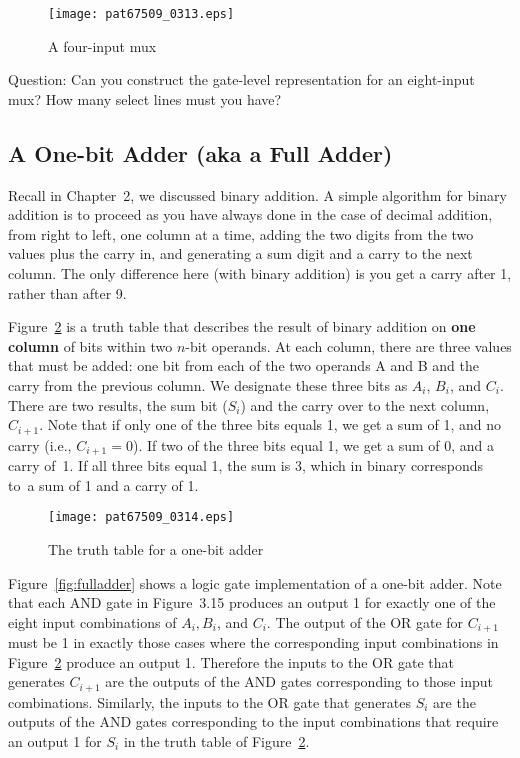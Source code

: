 \documentclass{patt}
\begin{document}
\begin{figure}
\centerline{\texttt{[image: pat67509\_0313.eps]}}
\caption{A four-input mux}
\label{fig:4mux}
\vspace{-6pt}
\end{figure}

Question: Can you construct the gate-level representation for an eight-input
mux? How many select lines must you have?
\FloatBarrier
\subsection{A One-bit Adder (aka a Full Adder)}

Recall in Chapter~2, we discussed binary addition.  A simple
algorithm for binary addition is to proceed as you have always done in
the case of decimal addition, from right to left, one column at a
time, adding the two digits from the two values plus the carry in, and
generating a sum digit and a carry to the next column.  The only
difference here (with binary addition) is you get a carry after 1, rather 
than after 9.

Figure~\ref{fig:ttadder} is a truth table that describes the result of binary
addition on {\bf one column} of bits within two $n$-bit operands.  At
each column, there are three values that must be added: one bit from
each of the two operands A and B and the carry from the previous column.  We
designate these three bits as $A_i$, $B_i$, and $C_i$.  There are
two results, the sum bit ($S_i$) and the carry over to the next column,
$C_{i+1}$.  Note that if only one of the three bits equals 1, we
get a sum of 1, and no carry (i.e., $C_{i+1} = 0$).  If two of the
three bits equal 1, we get a sum of 0, and a carry of~1.  If all three
bits equal 1, the sum is 3, which in binary corresponds to~a
sum of 1 and a carry of 1.

\begin{figure}
\centerline{\texttt{[image: pat67509\_0314.eps]}}
\caption{The truth table for a one-bit adder}
\label{fig:ttadder}
\vspace{-12pt}
\end{figure}

Figure~\ref{fig:fulladder} shows a logic gate implementation of a 
one-bit adder.  Note that each AND gate in Figure~3.15 produces an
output 1 for exactly one of the eight input combinations of $A_i,
B_i$, and $C_i$.  The output of the OR gate for $C_{i+1}$ must be 1
in exactly those cases where the corresponding input combinations in
Figure~\ref{fig:ttadder} produce an output 1.  Therefore the inputs to the 
OR gate that generates $C_{i+1}$ are the outputs of the 
AND gates corresponding to those input combinations.  Similarly, the inputs to 
the OR gate that generates $S_i$ are the outputs of the AND gates corresponding
to the input combinations that require an output 1 for $S_i$ in the truth
table of Figure~\ref{fig:ttadder}.
\end{document}
